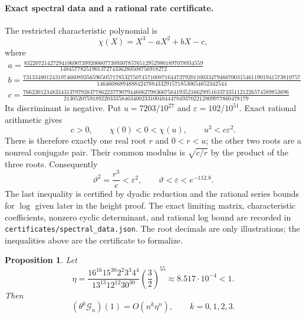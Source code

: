 \documentclass[11pt]{article}
\newtheorem{proposition}{Proposition}
\begin{document}
\paragraph{Exact spectral data and a rational rate certificate.}
The restricted characteristic polynomial is
\[
 \chi(X)=X^3-aX^2+bX-c,
\]
where
\begingroup\scriptsize
\begin{gather*}
 a=\frac{83220721427294106907399200607730930785765129529801897078934559}{1484577825190137274336280508756918272}\,\\
 b=\frac{731334801243107466089356596505717853275074571608716447379201100334794667003154611901941573810757}{146466868948884247884332915718530654652342544}\,\\
 c=\frac{76623012348334313797938377862237790794460627983667564193521662995163373351121226574589853696}{2130520759189220333584634002331004844478493702212809977860478179}\,
\end{gather*}
\endgroup
Its discriminant is negative. Put $u=7203/10^{27}$ and
$\varepsilon=102/10^{51}$. Exact rational arithmetic gives
\[
 c>0,\qquad\chi(0)<0<\chi(u),\qquad u^3<c\varepsilon^2.
\]
There is therefore exactly one real root $r$ and $0<r<u$; the other
two roots are a nonreal conjugate pair. Their common modulus is
$\sqrt{c/r}$ by the product of the three roots. Consequently
\[
 \vartheta^2=\frac{r^3}{c}<\varepsilon^2,
 \qquad \vartheta<\varepsilon<e^{-112.8}.
\]
The last inequality is certified by dyadic reduction and the rational
series bounds for $\log$ given later in the height proof.
The exact limiting matrix, characteristic coefficients, nonzero cyclic
determinant, and rational log bound are recorded in
\texttt{certificates/spectral\_data.json}. The root decimals are only
illustrations; the inequalities above are the certificate to formalize.

\begin{proposition}
\label{prop:z34-growth}
Let
\[
\eta=\frac{16^{16}15^{30}2^2 3^3 4^4}{13^{13}12^{12}30^{30}}
\left(\frac32\right)^{55}\approx8.517\cdot10^{-4}<1.
\]
Then
\[
(\theta^k\mathcal{G}_n)(1)=O(n^k\eta^n),
\qquad k=0,1,2,3.
\]
\end{proposition}
\end{document}
